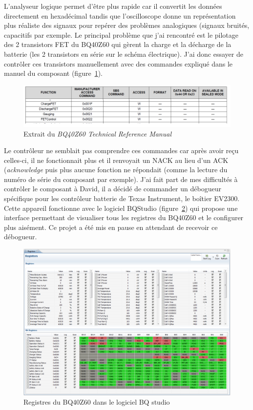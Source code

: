 \documentclass[a4paper, 12pt, sffamily]{report}
\begin{document}
L’analyseur logique permet d’être plus rapide car il convertit les données directement en hexadécimal tandis que l’oscilloscope donne un représentation plus réaliste des signaux pour repérer des problèmes analogiques (signaux bruités, capacitifs par exemple.
Le principal problème que j’ai rencontré est le pilotage des 2 transistors FET du BQ40Z60 qui gèrent la charge et la décharge de la batterie (les 2 transistors en série sur le schéma électrique).
J’ai donc essayer de contrôler ces transistors manuellement avec des commandes expliqué dans le manuel du composant (figure~\ref{fig:BQ40Z60_manual_excerpt}).

\begin{figure}[H]
\centering
\includegraphics[scale=0.82]{figures/screenshots/BQ40Z60_manual_excerpt.png}
\caption{Extrait du \emph{BQ40Z60 Technical Reference Manual}\cite{BQ40Z60_tech_manual}} 
\label{fig:BQ40Z60_manual_excerpt}
\end{figure}

Le contrôleur ne semblait pas comprendre ces commandes car après avoir reçu celles-ci, il ne fonctionnait plus et il renvoyait un NACK au lieu d’un ACK (\emph{acknowledge} puis plus aucune fonction ne répondait (comme la lecture du numéro de série du composant par exemple).
J’ai fait part de mes difficultés à contrôler le composant à David, il a décidé de commander un débogueur spécifique pour les contrôleur batterie de Texas Instrument, le boîtier EV2300. Cette appareil fonctionne avec le logiciel BQStudio (figure~\ref{fig:BQ40Z60_registers}) qui propose une interface permettant de visualiser tous les registres du BQ40Z60 et le configurer plus aisément. Ce projet a été mis en pause en attendant de recevoir ce débogueur.

\begin{figure}[H]
\centering
\includegraphics[scale=0.4]{figures/screenshots/BQ40Z60_registers.png}
\caption{Registres du BQ40Z60 dans le logiciel BQ studio}
\label{fig:BQ40Z60_registers}
\end{figure}
\end{document}
